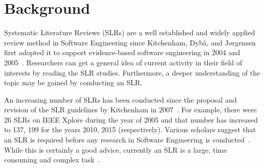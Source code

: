\documentclass{svjour3}
\theoremstyle{break}
\begin{document}
\section{Background}
\label{sect: sect2}


Systematic Literature Reviews
(SLRs)  are a well established and widely
applied review method in Software Engineering since Kitchenham, Dyb{\^{a}}, and
J{\o}rgensen first adopted it to support evidence-based software engineering in
2004 and 2005~\cite{kitchenham2004evidence,1377125}. 
Researchers can get a
general idea of current activity in their field of interests by reading the SLR studies. Furthermore, a
deeper understanding of the topic may be gained by conducting an SLR.

An increasing number of SLRs has been conducted since the proposal and revision of the SLR guidelines by Kitchenham in 2007~\cite{keele2007guidelines}. For example, there were 26 SLRs on IEEE Xplore during the year of 2005 and that
number has increased to 137, 199 for the years 2010, 2015 (respectively). Various scholars  suggest that an SLR is required before any research in Software
Engineering is conducted~\cite{keele2007guidelines}.
While this is certainly a good advice,
currently an SLR is
a large, time consuming and complex
task~\cite{hassler2016identification,hassler2014outcomes,carver2013identifying,bowes2012slurp}.
\end{document}
